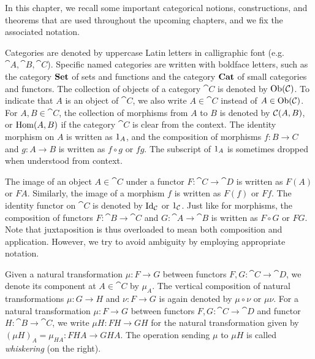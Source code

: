 In this chapter, we recall some important categorical notions, constructions, and theorems that are used throughout the upcoming chapters, and we fix the associated notation.

Categories are denoted by uppercase Latin letters in calligraphic font (e.g. $\cat{A}, \cat{B}, \cat{C}$). Specific named categories are written with boldface letters, such as the category $\Set$ of sets and functions and the category $\Cat$ of small categories and functors. The collection of objects of a category $\cat{C}$ is denoted by $\Ob{\cat{C}}$. To indicate that $A$ is an object of $\cat{C}$, we also write $A \in \cat{C}$ instead of $A \in \Ob{\cat{C}}$. For $A, B \in \cat{C}$, the collection of morphisms from $A$ to $B$ is denoted by $\Hom[\cat{C}]{A}{B}$, or $\Hom{A}{B}$ if the category $\cat{C}$ is clear from the context. The identity morphism on $A$ is written as $\id[A]$, and the composition of morphisms $f : B \to C$ and $g : A \to B$ is written as $f \circ g$ or $fg$. The subscript of $\id[A]$ is sometimes dropped when understood from context.

The image of an object $A \in \cat{C}$ under a functor $F : \cat{C} \to \cat{D}$ is written as $F(A)$ or $FA$. Similarly, the image of a morphism $f$ is written as $F(f)$ or $Ff$. The identity functor on $\cat{C}$ is denoted by $\idfunc[\cat{C}]$ or $\id[\cat{C}]$. Just like for morphisms, the composition of functors $F : \cat{B} \to \cat{C}$ and $G : \cat{A} \to \cat{B}$ is written as $F \circ G$ or $FG$.
Note that juxtaposition is thus overloaded to mean both composition and application. However, we try to avoid ambiguity by employing appropriate notation.

Given a natural transformation $\mu : F \to G$ between functors $F, G : \cat{C} \to \cat{D}$, we denote its component at $A \in \cat{C}$ by $\mu_A$. The vertical composition of natural transformations $\mu : G \to H$ and $\nu : F \to G$ is again denoted by $\mu \circ \nu$ or $\mu\nu$. For a natural transformation $\mu : F \to G$ between functors $F, G : \cat{C} \to \cat{D}$ and functor $H : \cat{B} \to \cat{C}$, we write $\mu H : FH \to GH$ for the natural transformation given by $(\mu H)_A = \mu_{HA} : FHA \to GHA$. The operation sending $\mu$ to $\mu H$ is called \textit{whiskering} (on the right).



